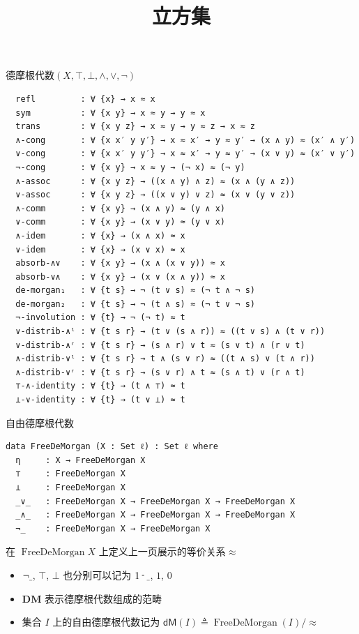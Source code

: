 \documentclass[aspectratio=169,xcolor=dvipsnames]{beamer}
\title{立方集}
\date{}
\newcommand\dM{\mathsf{dM}}
\newcommand\DM{\mathbf{DM}}
\newcommand{\shortminus}{\raisebox{0.3ex}{\scalebox{0.8}[1.0]{-}}}
\newcommand{\mathshortminus}{\mathbin{\text{\normalfont\shortminus}}}
\newcommand{\ul}{{\scalebox{0.4}[1.0]{\_}}}
\DeclareMathOperator\FreeDeMorgan{FreeDeMorgan}
\begin{document}
\begin{frame}
    \titlepage
\end{frame}

\begin{frame}{德摩根代数$(X,\top,\bot,\land,\lor,\neg)$}
\begin{verbatim}
  refl         : ∀ {x} → x ≈ x
  sym          : ∀ {x y} → x ≈ y → y ≈ x
  trans        : ∀ {x y z} → x ≈ y → y ≈ z → x ≈ z
  ∧-cong       : ∀ {x x′ y y′} → x ≈ x′ → y ≈ y′ → (x ∧ y) ≈ (x′ ∧ y′)
  ∨-cong       : ∀ {x x′ y y′} → x ≈ x′ → y ≈ y′ → (x ∨ y) ≈ (x′ ∨ y′)
  ¬-cong       : ∀ {x y} → x ≈ y → (¬ x) ≈ (¬ y)
  ∧-assoc      : ∀ {x y z} → ((x ∧ y) ∧ z) ≈ (x ∧ (y ∧ z))
  ∨-assoc      : ∀ {x y z} → ((x ∨ y) ∨ z) ≈ (x ∨ (y ∨ z)) 
  ∧-comm       : ∀ {x y} → (x ∧ y) ≈ (y ∧ x)
  ∨-comm       : ∀ {x y} → (x ∨ y) ≈ (y ∨ x)
  ∧-idem       : ∀ {x} → (x ∧ x) ≈ x
  ∨-idem       : ∀ {x} → (x ∨ x) ≈ x
  absorb-∧∨    : ∀ {x y} → (x ∧ (x ∨ y)) ≈ x
  absorb-∨∧    : ∀ {x y} → (x ∨ (x ∧ y)) ≈ x
  de-morgan₁   : ∀ {t s} → ¬ (t ∨ s) ≈ (¬ t ∧ ¬ s)
  de-morgan₂   : ∀ {t s} → ¬ (t ∧ s) ≈ (¬ t ∨ ¬ s)
  ¬-involution : ∀ {t} → ¬ (¬ t) ≈ t
  ∨-distrib-∧ˡ : ∀ {t s r} → (t ∨ (s ∧ r)) ≈ ((t ∨ s) ∧ (t ∨ r))
  ∨-distrib-∧ʳ : ∀ {t s r} → (s ∧ r) ∨ t ≈ (s ∨ t) ∧ (r ∨ t)
  ∧-distrib-∨ˡ : ∀ {t s r} → t ∧ (s ∨ r) ≈ ((t ∧ s) ∨ (t ∧ r))
  ∧-distrib-∨ʳ : ∀ {t s r} → (s ∨ r) ∧ t ≈ (s ∧ t) ∨ (r ∧ t)
  ⊤-∧-identity : ∀ {t} → (t ∧ ⊤) ≈ t
  ⊥-∨-identity : ∀ {t} → (t ∨ ⊥) ≈ t
\end{verbatim}
\end{frame}

\begin{frame}{自由德摩根代数}
  \begin{verbatim}
data FreeDeMorgan (X : Set ℓ) : Set ℓ where
  η     : X → FreeDeMorgan X                               
  ⊤     : FreeDeMorgan X                                   
  ⊥     : FreeDeMorgan X                                   
  _∨_   : FreeDeMorgan X → FreeDeMorgan X → FreeDeMorgan X 
  _∧_   : FreeDeMorgan X → FreeDeMorgan X → FreeDeMorgan X 
  ¬_    : FreeDeMorgan X → FreeDeMorgan X                  
  \end{verbatim}
在 $\FreeDeMorgan X$ 上定义上一页展示的等价关系$\approx$
\pause
\begin{itemize}
\item $\neg\ul$, $\top$, $\bot$ 也分别可以记为 $1\mathshortminus\ul$, $1$, $0$
\item $\DM$ 表示德摩根代数组成的范畴
\item 集合 $I$ 上的自由德摩根代数记为 $\dM(I) \triangleq \FreeDeMorgan(I)/\approx$
\end{itemize}
\end{frame}
\end{document}
